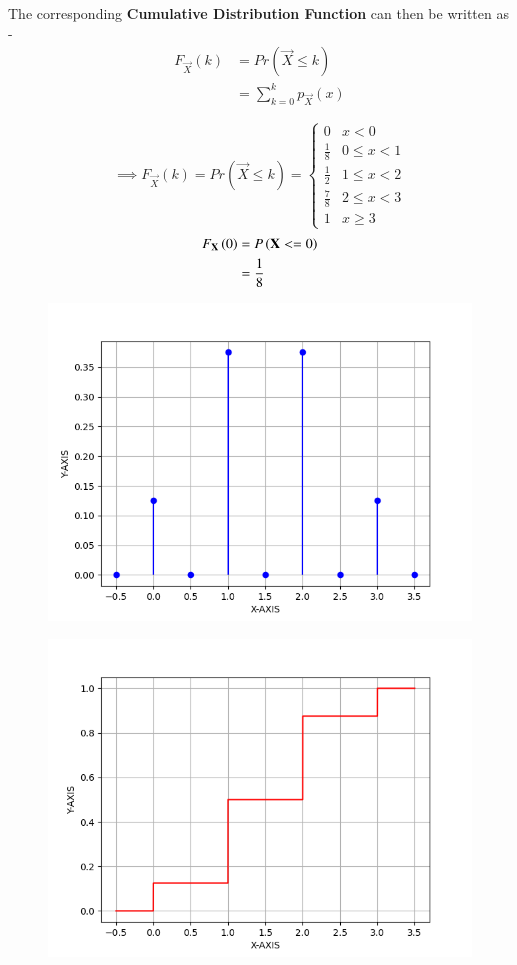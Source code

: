 \documentclass[journal]{IEEEtran}
\begin{document}
The corresponding \textbf{Cumulative Distribution Function} can then be written as - 
\begin{align}
	F_{\vec{X}}(k) &= Pr(\vec{X} \leq k) \\
		       &= \sum_{k=0}^{k} p_{\vec{X}} (x) 
\end{align}


\[
\implies F_{\vec{X}}(k) = Pr(\vec{X} \leq k) =
\begin{cases}
    0 & x < 0 \\
    \frac{1}{8} & 0 \leq x < 1 \\
    \frac{1}{2} & 1 \leq x < 2 \\
    \frac{7}{8} & 2 \leq x < 3 \\
    1 & x \geq 3
\end{cases}
\]
\begin{align}
	F_{\mathbf{X}} \left(0\right) &= P \left( \mathbf{X} <= 0 \right) \\
	                     &= \frac{1}{8}
\end{align}
\begin{figure}[h]
\centering
\includegraphics[width=\columnwidth]{figs/fig1.png}
\label{fig:Plot1} 
\end{figure}

\begin{figure}[h]
\centering
\includegraphics[width=\columnwidth]{figs/fig2.png}
\label{fig:Plot1} 
\end{figure}
\end{document}
